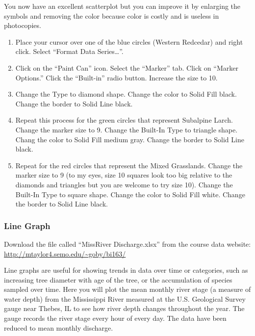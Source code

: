 \documentclass[12pt, hidelinks]{exam}
\newcommand{\VSpace}{\vspace{\baselineskip}}
\begin{document}
You now have an excellent scatterplot but you can improve it by enlarging the symbols and removing the color because  color is costly and is useless in photocopies.

\begin{enumerate}[resume]
	\item Place your cursor over one of the blue circles (Western Redcedar) and right click. Select “Format Data Series\dots”. 

	\item Click on the “Paint Can” icon. Select the “Marker” tab. Click on “Marker Options.” Click the “Built-in” radio button.  Increase the size to 10.
	
	\item Change the Type to diamond shape. Change the color to Solid Fill black. Change the border to Solid Line black.

	\item Repeat this process for the green circles that represent Subalpine Larch. Change the marker size to 9. Change the Built-In Type to triangle shape. Chang the color to Solid Fill medium gray.  Change the border to Solid Line black.

	\item Repeat for the red circles that represent the Mixed Grasslands. Change the marker size to 9 (to my eyes, size 10 squares look too big relative to the diamonds and triangles but you are welcome to try size 10). Change the Built-In Type to square shape. Change the color to Solid Fill white.  Change the border to Solid Line black.
\end{enumerate}

\subsubsection*{Line Graph}

Download the file called “MissRiver Discharge.xlsx” from the course data website: \url{http://mtaylor4.semo.edu/~goby/bi163/}\VSpace

Line graphs are useful for showing trends in data over time or categories, such as increasing tree diameter with age of the tree, or the accumulation of species sampled over time. Here you will plot the mean monthly river stage (a measure of water depth) from the Mississippi River measured at the U.S. Geological Survey gauge near Thebes, IL to see how river depth changes throughout the year. The gauge records the river stage every hour of every day. The data have been reduced to mean monthly discharge.
\end{document}
